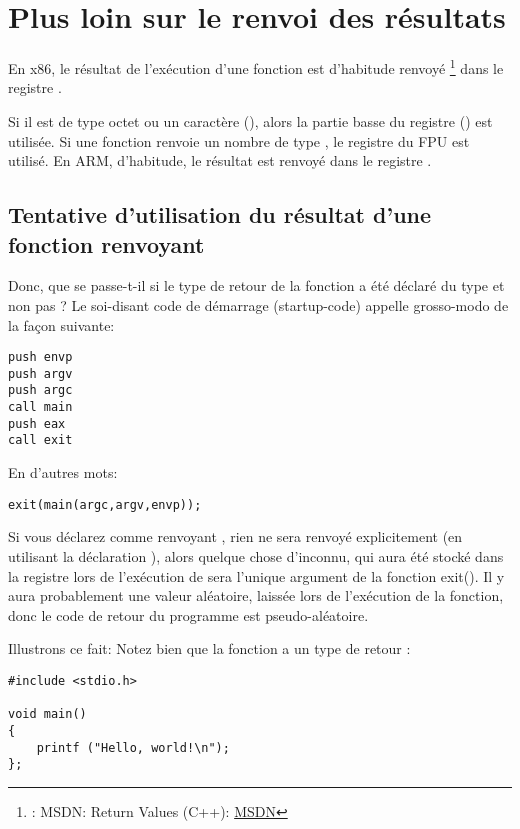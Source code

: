 ﻿\section{Plus loin sur le renvoi des résultats}


En x86, le résultat de l'exécution d'une fonction est d'habitude renvoyé
\footnote{\Seealso: MSDN: Return Values (C++): \href{http://go.yurichev.com/17258}{MSDN}}
dans le registre \EAX.

Si il est de type octet ou un caractère (\Tchar), alors la partie basse du registre
\EAX (\AL) est utilisée.
Si une fonction renvoie un nombre de type \Tfloat, le registre  du FPU est utilisé. %
En ARM, d'habitude, le résultat est renvoyé dans le registre .

\subsection{Tentative d'utilisation du résultat d'une fonction renvoyant \Tvoid}

Donc, que se passe-t-il si le type de retour de la fonction \main a été déclaré
du type \Tvoid et non pas \Tint?
Le soi-disant code de démarrage (startup-code) appelle \main grosso-modo de la façon
suivante:

\begin{lstlisting}[style=customasmx86]
push envp
push argv
push argc
call main
push eax
call exit
\end{lstlisting}

En d'autres mots:

\begin{lstlisting}[style=customc]
exit(main(argc,argv,envp));
\end{lstlisting}

Si vous déclarez \main comme renvoyant \Tvoid, rien ne sera renvoyé explicitement
(en utilisant la déclaration ), alors quelque chose d'inconnu, qui aura
été stocké dans la registre \EAX lors de l'exécution de \main sera l'unique argument
de la fonction exit().
Il y aura probablement une valeur aléatoire, laissée lors de l'exécution de la fonction,
donc le code de retour du programme est pseudo-aléatoire.
\par
Illustrons ce fait:
Notez bien  que la fonction \main a un type de retour \Tvoid:

\begin{lstlisting}[style=customc]
#include <stdio.h>

void main()
{
	printf ("Hello, world!\n");
};
\end{lstlisting}

